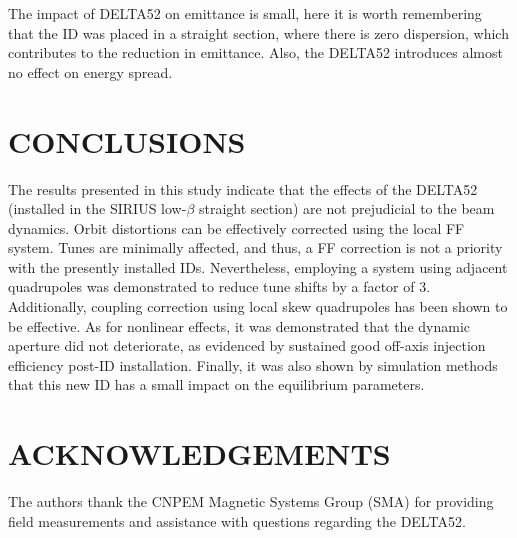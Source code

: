 \documentclass[a4paper,
               keeplastbox,   %
               ]{jacow}
\begin{document}
The impact of DELTA52 on emittance is small, here it is worth remembering that the ID was placed in a straight section, where there is zero dispersion, which contributes to the reduction in emittance. Also, the DELTA52 introduces almost no effect on energy spread.

\section{CONCLUSIONS}

The results presented in this study indicate that the effects of the DELTA52 (installed in the SIRIUS low-$\beta$ straight section) are not prejudicial to the beam dynamics. Orbit distortions can be effectively corrected using the local FF system. Tunes are minimally affected, and thus, a FF correction is not a priority with the presently installed IDs. Nevertheless, employing a system using adjacent quadrupoles was demonstrated to reduce tune shifts by a factor of 3. Additionally, coupling correction using local skew quadrupoles has been shown to be effective. As for nonlinear effects, it was demonstrated that the dynamic aperture did not deteriorate, as evidenced by sustained good off-axis injection efficiency post-ID installation.
Finally, it was also shown by simulation methods that this new ID has a small impact on the equilibrium parameters. 

\section{ACKNOWLEDGEMENTS}
The authors thank the CNPEM Magnetic Systems Group (SMA) for providing field measurements and assistance with questions regarding the DELTA52.
\end{document}
